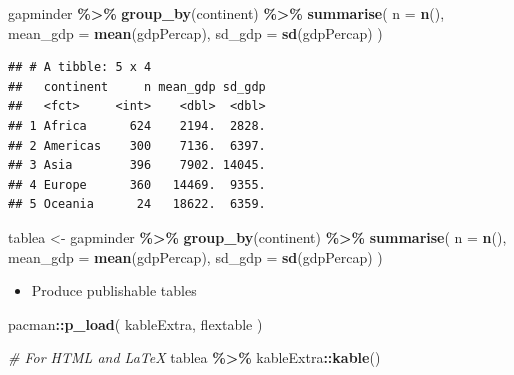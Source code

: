\documentclass[
]{book}
\newenvironment{Shaded}{\begin{snugshade}}{\end{snugshade}}
\newcommand{\AttributeTok}[1]{\textcolor[rgb]{0.13,0.29,0.53}{#1}}
\newcommand{\CommentTok}[1]{\textcolor[rgb]{0.56,0.35,0.01}{\textit{#1}}}
\newcommand{\FunctionTok}[1]{\textcolor[rgb]{0.13,0.29,0.53}{\textbf{#1}}}
\newcommand{\NormalTok}[1]{#1}
\newcommand{\OtherTok}[1]{\textcolor[rgb]{0.56,0.35,0.01}{#1}}
\newcommand{\SpecialCharTok}[1]{\textcolor[rgb]{0.81,0.36,0.00}{\textbf{#1}}}
\providecommand{\tightlist}{%
  \setlength{\itemsep}{0pt}\setlength{\parskip}{0pt}}
\begin{document}
\begin{Shaded}
\begin{Highlighting}[]
\NormalTok{gapminder }\SpecialCharTok{\%\textgreater{}\%}
  \FunctionTok{group\_by}\NormalTok{(continent) }\SpecialCharTok{\%\textgreater{}\%}
  \FunctionTok{summarise}\NormalTok{(}
    \AttributeTok{n =} \FunctionTok{n}\NormalTok{(),}
    \AttributeTok{mean\_gdp =} \FunctionTok{mean}\NormalTok{(gdpPercap),}
    \AttributeTok{sd\_gdp =} \FunctionTok{sd}\NormalTok{(gdpPercap)}
\NormalTok{  )}
\end{Highlighting}
\end{Shaded}

\begin{verbatim}
## # A tibble: 5 x 4
##   continent     n mean_gdp sd_gdp
##   <fct>     <int>    <dbl>  <dbl>
## 1 Africa      624    2194.  2828.
## 2 Americas    300    7136.  6397.
## 3 Asia        396    7902. 14045.
## 4 Europe      360   14469.  9355.
## 5 Oceania      24   18622.  6359.
\end{verbatim}

\begin{Shaded}
\begin{Highlighting}[]
\NormalTok{tablea }\OtherTok{\textless{}{-}}\NormalTok{ gapminder }\SpecialCharTok{\%\textgreater{}\%}
  \FunctionTok{group\_by}\NormalTok{(continent) }\SpecialCharTok{\%\textgreater{}\%}
  \FunctionTok{summarise}\NormalTok{(}
    \AttributeTok{n =} \FunctionTok{n}\NormalTok{(),}
    \AttributeTok{mean\_gdp =} \FunctionTok{mean}\NormalTok{(gdpPercap),}
    \AttributeTok{sd\_gdp =} \FunctionTok{sd}\NormalTok{(gdpPercap)}
\NormalTok{  )}
\end{Highlighting}
\end{Shaded}

\begin{itemize}
\tightlist
\item
  Produce publishable tables
\end{itemize}

\begin{Shaded}
\begin{Highlighting}[]
\NormalTok{pacman}\SpecialCharTok{::}\FunctionTok{p\_load}\NormalTok{(}
\NormalTok{  kableExtra,}
\NormalTok{  flextable}
\NormalTok{)}

\CommentTok{\# For HTML and LaTeX}
\NormalTok{tablea }\SpecialCharTok{\%\textgreater{}\%}\NormalTok{ kableExtra}\SpecialCharTok{::}\FunctionTok{kable}\NormalTok{()}
\end{Highlighting}
\end{Shaded}
\end{document}
